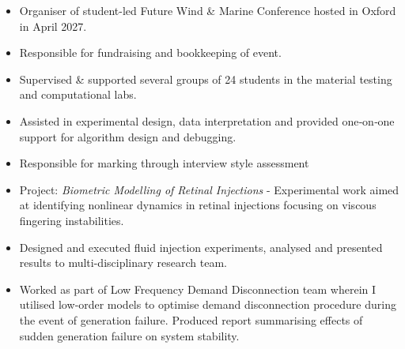 \documentclass{cv}
\begin{document}
\begin{minipage}[t]{0.65\textwidth}
\begin{itemize}
	\item Organiser of student-led Future Wind \& Marine Conference hosted in Oxford in April 2027.
	\item Responsible for fundraising and bookkeeping of event.
\end{itemize}
\cvitemskip


\begin{itemize}
	\item Supervised \& supported several groups of 24 students in the material testing and computational labs.
	\item Assisted in experimental design, data interpretation and provided one‑on‑one support for algorithm design and debugging.
	\item Responsible for marking through interview style assessment
\end{itemize}
\cvitemskip

\begin{itemize}
	\item Project: \textit{Biometric Modelling of Retinal Injections} - Experimental work aimed at identifying nonlinear dynamics in retinal injections focusing on viscous fingering instabilities.
	\item Designed and executed fluid injection experiments, analysed and presented results to multi-disciplinary research team.
\end{itemize}
\cvitemskip

\begin{itemize}
	\item Worked as part of Low Frequency Demand Disconnection team wherein I utilised low‑order models to optimise demand disconnection procedure during the event of generation failure. Produced report summarising effects of sudden generation failure on system stability.
\end{itemize}


\end{minipage}
\hspace{0.01\textwidth}
\end{document}
